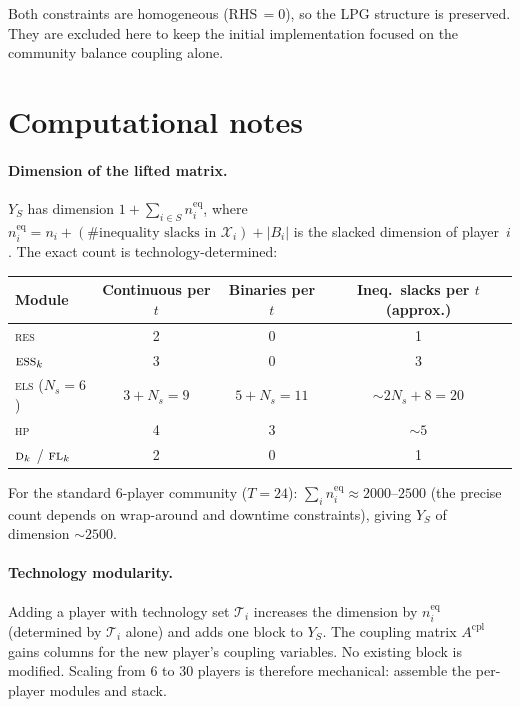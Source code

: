 \documentclass[11pt]{article}
\theoremstyle{definition}
\newcommand{\Acom}{A^{\mathrm{cpl}}}
\newcommand{\feas}{\mathcal{X}}
\newcommand{\Tech}{\mathcal{T}}
\begin{document}
Both constraints are homogeneous (RHS$\,=0$), so the LPG structure is
preserved.  They are excluded here to keep the initial implementation
focused on the community balance coupling alone.

\section{Computational notes}
\label{sec:comp}

\paragraph{Dimension of the lifted matrix.}
$Y_S$ has dimension $1+\sum_{i\in S}n_i^{\mathrm{eq}}$, where
$n_i^{\mathrm{eq}}=n_i+(\text{\# inequality slacks in }
\feas_i)+|B_i|$ is the slacked dimension of player~$i$.  The exact
count is technology-determined:
\begin{center}\small
\begin{tabular}{@{}l c c c@{}}
\toprule
Module & Continuous per $t$ & Binaries per $t$ & Ineq.\ slacks per $t$ (approx.)\\
\midrule
\textsc{res} & 2 & 0 & 1 \\
$\textsc{ess}_k$ & 3 & 0 & 3 \\
\textsc{els} ($N_s=6$) & $3+N_s=9$ & $5+N_s=11$ & $\sim 2N_s+8=20$ \\
\textsc{hp} & 4 & 3 & $\sim 5$ \\
$\textsc{d}_k$ / $\textsc{fl}_k$ & 2 & 0 & 1 \\
\bottomrule
\end{tabular}
\end{center}
For the standard 6-player community ($T=24$):
$\sum_in_i^{\mathrm{eq}}\approx2000$--$2500$ (the precise count depends
on wrap-around and downtime constraints), giving $Y_S$ of dimension
$\sim\!2500$.

\paragraph{Technology modularity.}
Adding a player with technology set $\Tech_i$ increases the dimension by
$n_i^{\mathrm{eq}}$ (determined by $\Tech_i$ alone) and adds one block
to $Y_S$.  The coupling matrix $\Acom$ gains columns for the new
player's coupling variables.  No existing block is modified.  Scaling
from 6 to 30 players is therefore mechanical: assemble the per-player
modules and stack.
\end{document}

